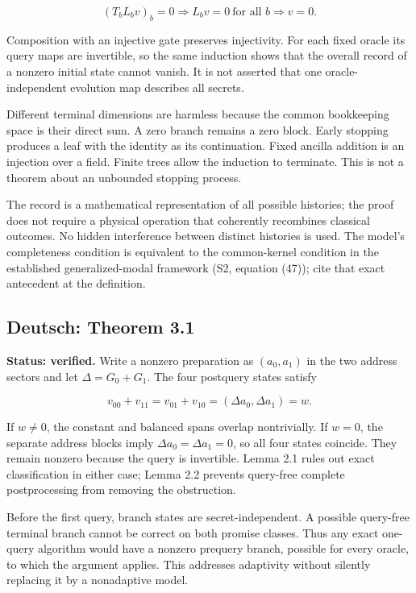 \documentclass[
  11pt,
]{article}
\begin{document}
\[
(T_bL_bv)_b=0\Longrightarrow L_bv=0\ \text{for all }b\Longrightarrow v=0.
\]

Composition with an injective gate preserves injectivity. For each fixed
oracle its query maps are invertible, so the same induction shows that
the overall record of a nonzero initial state cannot vanish. It is not
asserted that one oracle-independent evolution map describes all
secrets.

Different terminal dimensions are harmless because the common
bookkeeping space is their direct sum. A zero branch remains a zero
block. Early stopping produces a leaf with the identity as its
continuation. Fixed ancilla addition is an injection over a field.
Finite trees allow the induction to terminate. This is not a theorem
about an unbounded stopping process.

The record is a mathematical representation of all possible histories;
the proof does not require a physical operation that coherently
recombines classical outcomes. No hidden interference between distinct
histories is used. The model's completeness condition is equivalent to
the common-kernel condition in the established generalized-modal
framework (S2, equation (47)); cite that exact antecedent at the
definition.

\subsection{Deutsch: Theorem 3.1}\label{deutsch-theorem-3.1}

\textbf{Status: verified.} Write a nonzero preparation as \((a_0,a_1)\)
in the two address sectors and let \(\Delta=G_0+G_1\). The four
postquery states satisfy

\[
v_{00}+v_{11}=v_{01}+v_{10}=(\Delta a_0,\Delta a_1)=w.
\]

If \(w\ne0\), the constant and balanced spans overlap nontrivially. If
\(w=0\), the separate address blocks imply \(\Delta a_0=\Delta a_1=0\),
so all four states coincide. They remain nonzero because the query is
invertible. Lemma 2.1 rules out exact classification in either case;
Lemma 2.2 prevents query-free complete postprocessing from removing the
obstruction.

Before the first query, branch states are secret-independent. A possible
query-free terminal branch cannot be correct on both promise classes.
Thus any exact one-query algorithm would have a nonzero prequery branch,
possible for every oracle, to which the argument applies. This addresses
adaptivity without silently replacing it by a nonadaptive model.
\end{document}
